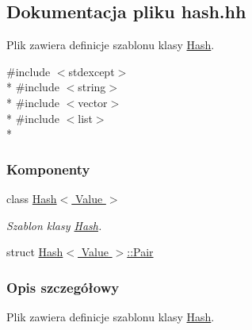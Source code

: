 \hypertarget{hash_8hh}{\subsection{Dokumentacja pliku hash.\-hh}
\label{hash_8hh}
}


Plik zawiera definicje szablonu klasy \hyperlink{class_hash}{Hash}.  


{\ttfamily \#include $<$stdexcept$>$}\\*
{\ttfamily \#include $<$string$>$}\\*
{\ttfamily \#include $<$vector$>$}\\*
{\ttfamily \#include $<$list$>$}\\*
\subsubsection*{Komponenty}
\begin{DoxyCompactItemize}
\item 
class \hyperlink{class_hash}{Hash$<$ Value $>$}
\begin{DoxyCompactList}\small\item\em Szablon klasy \hyperlink{class_hash}{Hash}. \end{DoxyCompactList}\item 
struct \hyperlink{struct_hash_1_1_pair}{Hash$<$ Value $>$\-::\-Pair}
\end{DoxyCompactItemize}


\subsubsection{Opis szczegółowy}
Plik zawiera definicje szablonu klasy \hyperlink{class_hash}{Hash}. 